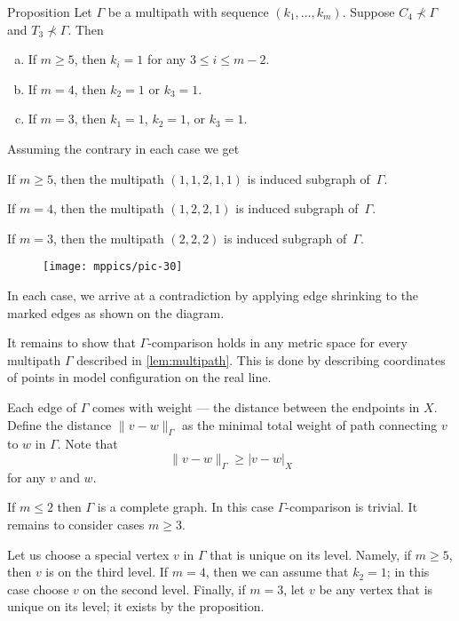 \documentclass{article}
\begin{document}
\begin{thm}{Proposition}\label{lem:multipath}
Let $\Gamma$ be a multipath with sequence $(k_1,\dots, k_m)$.
Suppose $C_4\nprec\Gamma$ and  $T_3\nprec\Gamma$.
Then 
\begin{enumerate}[(a)]
 \item\label{lem:multipath:5} If $m\ge 5$, then $k_i=1$ for any $3\le i\le m-2$.
 \item\label{lem:multipath:4} If $m= 4$, then $k_2=1$ or $k_3=1$.
 \item\label{lem:multipath:3} If $m= 3$, then $k_1=1$, $k_2=1$, or $k_3=1$.
\end{enumerate}

\end{thm}

 Assuming the contrary in each case we get

If $m\ge 5$, then the multipath $(1,1,2,1,1)$ is induced subgraph of~$\Gamma$.

If $m=4$, then the multipath $(1,2,2,1)$ is induced subgraph of~$\Gamma$.

If $m=3$, then the multipath $(2,2,2)$ is induced subgraph of~$\Gamma$.

\begin{figure}[ht!]
\centering
\texttt{[image: mppics/pic-30]}
\end{figure}

In each case, we arrive at a contradiction by applying edge shrinking to the marked edges as shown on the diagram.
\qeds


It remains to show that $\Gamma$-comparison holds in any metric space for every multipath $\Gamma$ described in \ref{lem:multipath}.
This is done by describing coordinates of points in model configuration on the real line.

Each edge of $\Gamma$ comes with weight --- the distance between the endpoints in $X$.
Define the distance $\|v-w\|_\Gamma$ as the minimal total weight of path connecting $v$ to $w$ in $\Gamma$.
Note that 
\[\|v-w\|_\Gamma\ge |v-w|_X\]
for any $v$ and $w$.

If $m\le 2$ then $\Gamma$ is a complete graph.
In this case $\Gamma$-comparison is trivial.
It remains to consider cases $m\ge3$.

Let us choose a special vertex $v$ in $\Gamma$ that is unique on its level.
Namely, if $m\ge 5$, then $v$ is on the third level.
If $m=4$, then we can assume that $k_2=1$; in this case choose $v$ on the second level.
Finally, if $m=3$, let $v$ be any vertex that is unique on its level; it exists by the proposition. 
\end{document}

